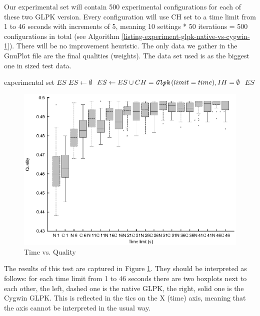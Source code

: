 Our experimental set will contain 500 experimental configurations for each of these two GLPK version. Every configuration will use  CH set to a time limit from 1 to 46 seconds with increments of 5, meaning 10 settings * 50 iterations = 500 configurations in total (see Algorithm \ref{listing-experiment-glpk-native-vs-cygwin-1}). There will be no improvement heuristic. The only data we gather in the GnuPlot file are the final qualities (weights). The data set used is  as the biggest one in sized test data.\\

\begin{algorithm}
\caption{GLPK: Native vs. Cygwin Set Generation 1}
\label{listing-experiment-glpk-native-vs-cygwin-1}
\begin{algorithmic}
\ENSURE experimental set $ES$
\STATE $ES \gets \emptyset$
    \STATE $ES \gets ES \cup {CH = \texttt{\textit{Glpk}}(limit = time), IH = \emptyset}$
  \ENDFOR
\ENDFOR
\RETURN $ES$
\end{algorithmic}
\end{algorithm}

\begin{figure}
  \caption{Time vs. Quality}
  \label{image-experiment-time-vs-quality}
  \centering
    \includegraphics[width=\textwidth]{images/experiments/time-vs-quality}
\end{figure}

The results of this test are captured in Figure \ref{image-experiment-time-vs-quality}. They should be interpreted as follows: for each time limit from 1 to 46 seconds there are two boxplots next to each other, the left, dashed one is the native GLPK, the right, solid one is the Cygwin GLPK. This is reflected in the tics on the X (time) axis, meaning that the axis cannot be interpreted in the usual way.

